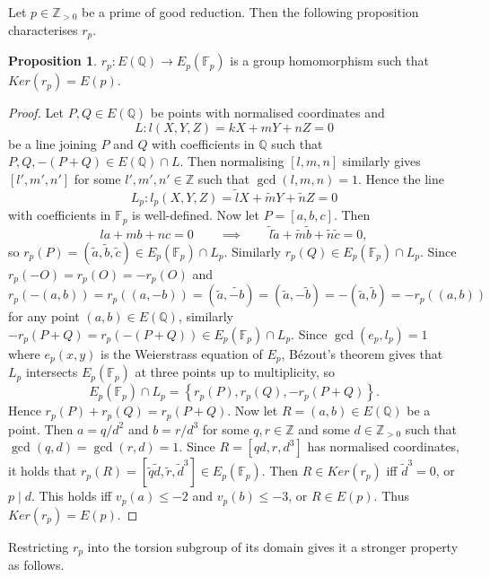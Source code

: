 \documentclass{article}
\newcommand{\F}{\mathbb{F}}
\newcommand{\Z}{\mathbb{Z}}
\newcommand{\Q}{\mathbb{Q}}
\newcommand{\rb}[1]{\left( #1 \right)}
\renewcommand{\sb}[1]{\left[ #1 \right]}
\newcommand{\cb}[1]{\left\{ #1 \right\}}
\theoremstyle{definition}\newtheorem*{definition}{Definition}
\theoremstyle{definition}\newtheorem*{example}{Example}
\theoremstyle{definition}\newtheorem*{remark}{Remark}
\newtheorem{proposition}{Proposition}[subsection]
\begin{document}
Let $ p \in \Z_{> 0} $ be a prime of good reduction. Then the following proposition characterises $ r_p $.

\begin{proposition}
$ r_p : E\rb{\Q} \to E_p\rb{\F_p} $ is a group homomorphism such that $ Ker\rb{r_p} = E\rb{p} $.
\end{proposition}

\begin{proof}
Let $ P, Q \in E\rb{\Q} $ be points with normalised coordinates and
$$ L : l\rb{X, Y, Z} = kX + mY + nZ = 0 $$
be a line joining $ P $ and $ Q $ with coefficients in $ \Q $ such that $ P, Q, -\rb{P + Q} \in E\rb{\Q} \cap L $. Then normalising $ \sb{l, m, n} $ similarly gives $ \sb{l', m', n'} $ for some $ l', m', n '\in \Z $ such that $ \gcd\rb{l, m, n} = 1 $. Hence the line
$$ L_p : l_p\rb{X, Y, Z} = \tilde{l}X + \tilde{m}Y + \tilde{n}Z = 0 $$
with coefficients in $ \F_p $ is well-defined. Now let $ P = \sb{a, b, c} $. Then
$$ la + mb + nc = 0 \qquad \implies \qquad \tilde{l}\tilde{a} + \tilde{m}\tilde{b} + \tilde{n}\tilde{c} = 0, $$
so $ r_p\rb{P} = \rb{\tilde{a}, \tilde{b}, \tilde{c}} \in E_p\rb{\F_p} \cap L_p $. Similarly $ r_p\rb{Q} \in E_p\rb{\F_p} \cap L_p $. Since $ r_p\rb{-O} = r_p\rb{O} = -r_p\rb{O} $ and
$$ r_p\rb{-\rb{a, b}} = r_p\rb{\rb{a, -b}} = \rb{\tilde{a}, \tilde{-b}} = \rb{\tilde{a}, -\tilde{b}} = -\rb{\tilde{a}, \tilde{b}} = -r_p\rb{\rb{a, b}} $$
for any point $ \rb{a, b} \in E\rb{\Q} $, similarly $ -r_p\rb{P + Q} = r_p\rb{-\rb{P + Q}} \in E_p\rb{\F_p} \cap L_p $. Since $ \gcd\rb{e_p, l_p} = 1 $ where $ e_p\rb{x, y} $ is the Weierstrass equation of $ E_p $, Bézout's theorem gives that $ L_p $ intersects $ E_p\rb{\F_p} $ at three points up to multiplicity, so
$$ E_p\rb{\F_p} \cap L_p = \cb{r_p\rb{P}, r_p\rb{Q}, -r_p\rb{P + Q}}. $$
Hence $ r_p\rb{P} + r_p\rb{Q} = r_p\rb{P + Q} $. Now let $ R = \rb{a, b} \in E\rb{\Q} $ be a point. Then $ a = q / d^2 $ and $ b = r / d^3 $ for some $ q, r \in \Z $ and some $ d \in \Z_{> 0} $ such that $ \gcd\rb{q, d} = \gcd\rb{r, d} = 1 $. Since $ R = \sb{qd, r, d^3} $ has normalised coordinates, it holds that $ r_p\rb{R} = \sb{\tilde{q}\tilde{d}, \tilde{r}, \tilde{d}^3} \in E_p\rb{\F_p} $. Then $ R \in Ker\rb{r_p} $ iff $ \tilde{d}^3 = 0 $, or $ p \mid d $. This holds iff $ v_p\rb{a} \le -2 $ and $ v_p\rb{b} \le -3 $, or $ R \in E\rb{p} $. Thus $ Ker\rb{r_p} = E\rb{p} $.
\end{proof}

Restricting $ r_p $ into the torsion subgroup of its domain gives it a stronger property as follows.
\end{document}
